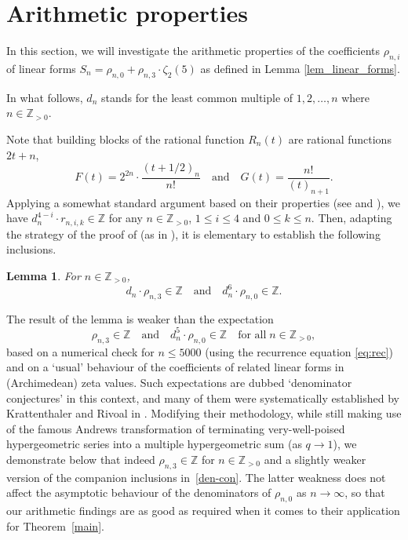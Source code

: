 \documentclass[12pt]{article}
\let\le\leqslant
\newtheorem{lemma}[theorem]{Lemma}
\theoremstyle{remark}
\numberwithin{equation}{section}
\begin{document}
\section{Arithmetic properties}
In this section, we will investigate the arithmetic properties of the coefficients $\rho_{n,i}$ of linear forms $S_n = \rho_{n,0} + \rho_{n,3} \cdot \zeta_2(5)$ as defined in Lemma \ref{lem_linear_forms}.

In what follows, $d_n$ stands for the least common multiple of $1,2,\dots,n$ where $n \in \mathbb{Z}_{>0}$. 

Note that building blocks of the rational function $R_n(t)$ are rational functions $2t+n$,
\[
F(t) = 2^{2n} \cdot \frac{(t+1/2)_n}{n!}
\quad\text{and}\quad
G(t) = \frac{n!}{(t)_{n+1}}.
\]
Applying a somewhat standard argument based on their properties (see \cite[Lemma 4.2]{Lai2025+b} and \cite[Lemma 16]{Zud2004}), we have $d_n^{4-i} \cdot r_{n,i,k} \in \mathbb{Z}$ for any $n \in \mathbb{Z}_{>0}$, $1 \le i \le 4$ and $0 \le k \le n$. 
Then, adapting the strategy of the proof of \cite[Lemma 2]{FSZ2019} (as in \cite[Lemma 4.6]{Lai2025}), it is elementary to establish the following inclusions.

\begin{lemma}
\label{lem_arith_rho}
For $n \in \mathbb{Z}_{>0}$,
\[ 
d_{n} \cdot \rho_{n,3} \in \mathbb{Z}
\quad\text{and}\quad
d_{n}^6 \cdot \rho_{n,0} \in \mathbb{Z}. 
\]
\end{lemma}

The result of the lemma is weaker than the expectation
\begin{equation}
\rho_{n,3} \in \mathbb{Z}
\quad\text{and}\quad
d_{n}^5 \cdot \rho_{n,0} \in \mathbb{Z}
\quad\text{for all}\; n\in\mathbb Z_{>0},
\label{den-con}
\end{equation}
based on a numerical check for $n\le 5000$ (using the recurrence equation \eqref{eq:rec}) and on a `usual' behaviour of the coefficients of related linear forms in (Archimedean) zeta values.
Such expectations are dubbed `denominator conjectures' in this context, and many of them were systematically established by Krattenthaler and Rivoal in \cite{KR2007}.
Modifying their methodology, while still making use of the famous Andrews transformation \cite{And1975} of terminating very-well-poised hypergeometric series into a multiple hypergeometric sum (as $q\to1$), we demonstrate below that indeed $\rho_{n,3} \in \mathbb{Z}$ for $n\in\mathbb Z_{>0}$ and a slightly weaker version of the companion inclusions in~\eqref{den-con}.
The latter weakness does not affect the asymptotic behaviour of the denominators of $\rho_{n,0}$ as $n\to\infty$, so that our arithmetic findings are as good as required when it comes to their application for Theorem~\ref{main}.
\end{document}
